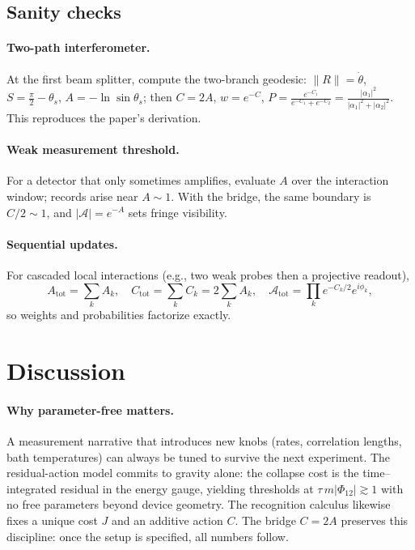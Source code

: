 \documentclass[11pt,letterpaper]{article}
\theoremstyle{definition}
\begin{document}
\subsection{Sanity checks}

\paragraph{Two-path interferometer.}
At the first beam splitter, compute the two-branch geodesic:
\(\|R\|=\dot\theta\), \(S=\tfrac{\pi}{2}-\theta_s\), \(A=-\ln\sin\theta_s\); then \(C=2A\), \(w=e^{-C}\), \(P=\frac{e^{-C_1}}{e^{-C_1}+e^{-C_2}}=\frac{|\alpha_1|^2}{|\alpha_1|^2+|\alpha_2|^2}\). This reproduces the paper’s derivation.
\paragraph{Weak measurement threshold.}
For a detector that only sometimes amplifies, evaluate \(A\) over the interaction window; records arise near \(A\sim 1\). With the bridge, the same boundary is \(C/2\sim 1\), and \(|\mathcal A|=e^{-A}\) sets fringe visibility.
\paragraph{Sequential updates.}
For cascaded local interactions (e.g., two weak probes then a projective readout),
\[
A_{\mathrm{tot}}=\sum_k A_k,\quad
C_{\mathrm{tot}}=\sum_k C_k=2\sum_k A_k,\quad
\mathcal A_{\mathrm{tot}}=\prod_k e^{-C_k/2}e^{i\phi_k},
\]
so weights and probabilities factorize exactly.
\section{Discussion}
\label{sec:discussion}

\paragraph{Why parameter-free matters.}
A measurement narrative that introduces new knobs (rates, correlation lengths, bath temperatures) can always be tuned to survive the next experiment. The residual-action model commits to gravity alone: the collapse cost is the time–integrated residual in the energy gauge, yielding thresholds at \(\tau\,m|\Phi_{12}|\gtrsim 1\) with no free parameters beyond device geometry. The recognition calculus likewise fixes a unique cost \(J\) and an additive action \(C\). The bridge \(C=2A\) preserves this discipline: once the setup is specified, all numbers follow.
\end{document}
